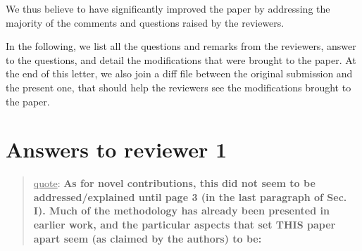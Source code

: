 \documentclass[a4paper]{article}
\newcommand{\ndone}[0]{\textcolor{red}{TODO}}
\newcommand\quot[1]{\begin{quote} \underline{quote}: \textbf{#1}\end{quote}}
\begin{document}
We thus believe to have significantly improved the paper by addressing the majority of the comments and questions raised by the reviewers.

\bigskip

In the following, we list all the questions and remarks from the reviewers, answer to the questions, and detail the modifications that were brought to the paper.
At the end of this letter, we also join a diff file between the original submission and the present one, that should help the reviewers see the modifications 
brought to the paper.


\section{Answers to reviewer 1}

\quot {As for novel contributions, this did not seem to be addressed/explained
until page 3 (in the last paragraph of Sec. I). Much of the methodology
has already been presented in earlier work, and the particular aspects
that set THIS paper apart seem (as claimed by the authors) to be: 
}
\end{document}
